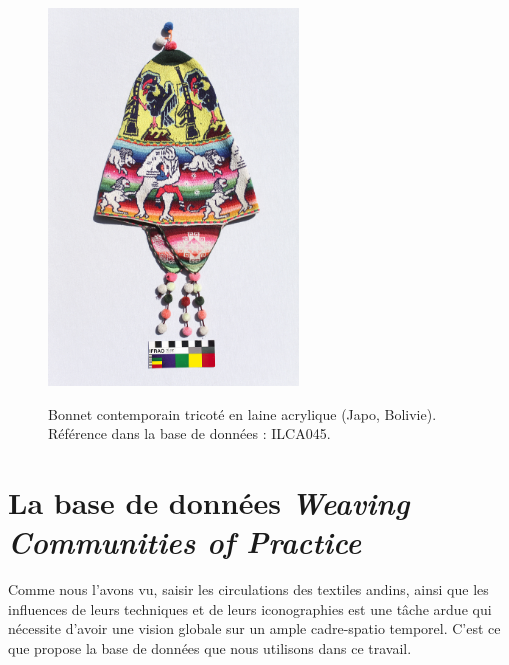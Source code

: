 \begin{figure}[!h]
\begin{minipage}[c]{.5\linewidth}
\begin{center}
        		\includegraphics[height=10cm]{../images/ILCA045.jpg}
		 \caption{Bonnet contemporain tricoté en laine acrylique (Japo, Bolivie).\\ Référence dans la base de données : ILCA045.}
	\end{center}
    \label{fig:ILCA045}   
    \end{minipage}
\end{figure}


\section{La base de données \textit{Weaving Communities of Practice}}

Comme nous l'avons vu, saisir les circulations des textiles andins, ainsi que les influences de leurs techniques et de leurs iconographies est une tâche ardue qui nécessite d'avoir une vision globale sur un ample cadre-spatio temporel. C'est ce que propose la base de données que nous utilisons dans ce travail.


